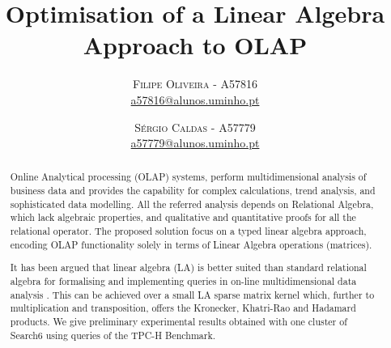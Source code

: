 \documentclass[twoside]{article}
\title{\vspace{-15mm}\fontsize{24pt}{10pt}\selectfont\textbf{Optimisation of a Linear Algebra Approach to OLAP}} %
\author{
\large
\textsc{Filipe Oliveira} - \textsc{A57816}\\
\normalsize \href{mailto:a57816@alunos.uminho.pt}{a57816@alunos.uminho.pt}
\vspace{-5mm}
\and
\textsc{Sérgio Caldas} - \textsc{A57779}\\
\normalsize \href{mailto:a57779@alunos.uminho.pt}{a57779@alunos.uminho.pt}
}
\begin{document}
\maketitle %

\thispagestyle{fancy} %


\begin{abstract}
\indent 
\par Online Analytical processing (OLAP) systems, perform multidimensional analysis of business data and provides the capability for complex calculations, trend analysis, and sophisticated data modelling. 
All the referred analysis depends on Relational Algebra, which lack algebraic properties, and qualitative and quantitative proofs for all the relational operator.
The proposed solution focus on a typed linear algebra approach, encoding OLAP functionality solely in terms of Linear Algebra operations (matrices).
\par It has been argued that linear algebra (LA) is better suited than standard relational algebra for formalising and implementing queries in on-line multidimensional data analysis \cite{macedo2015linear} \cite{da2015benchmarking}. This can be achieved over a small LA sparse matrix kernel which, further to multiplication and transposition, offers the Kronecker, Khatri-Rao and Hadamard products.
We give preliminary experimental results obtained with one cluster of Search6 using queries of the TPC-H Benchmark.
\end{abstract}
\vspace{0.5cm}

\begin{multicols}{2} %










 





\end{multicols}
\end{document}
